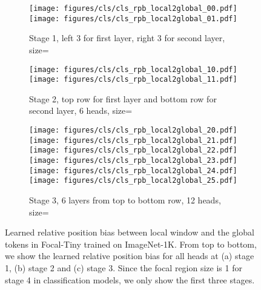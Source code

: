 \documentclass{article}
\begin{document}
\begin{figure}[t]
\begin{subfigure}{\textwidth}
  \texttt{[image: figures/cls/cls\_rpb\_local2global\_00.pdf]}
  \texttt{[image: figures/cls/cls\_rpb\_local2global\_01.pdf]}  
  \caption{Stage 1, left 3 for first layer, right 3 for second layer, size=}
\end{subfigure}
\begin{subfigure}{\textwidth}
  \texttt{[image: figures/cls/cls\_rpb\_local2global\_10.pdf]}
  \texttt{[image: figures/cls/cls\_rpb\_local2global\_11.pdf]}  
\caption{Stage 2, top row for first layer and bottom row for second layer, 6 heads, size=}
\end{subfigure}
\begin{subfigure}{\textwidth}
  \texttt{[image: figures/cls/cls\_rpb\_local2global\_20.pdf]}
  \texttt{[image: figures/cls/cls\_rpb\_local2global\_21.pdf]}    
  \texttt{[image: figures/cls/cls\_rpb\_local2global\_22.pdf]}    
  \texttt{[image: figures/cls/cls\_rpb\_local2global\_23.pdf]}    
  \texttt{[image: figures/cls/cls\_rpb\_local2global\_24.pdf]}    
  \texttt{[image: figures/cls/cls\_rpb\_local2global\_25.pdf]}      
\caption{Stage 3, 6 layers from top to bottom row, 12 heads, size=}
\end{subfigure}
  \caption{Learned relative position bias between local window and the global tokens in Focal-Tiny trained on ImageNet-1K. From top to bottom, we show the learned relative position bias for all heads at (a) stage 1, (b) stage 2 and (c) stage 3. Since the focal region size is 1 for stage 4 in classification models, we only show the first three stages.}
  \label{fig:local2global_rpb_imagenet}
\end{figure}
\end{document}
